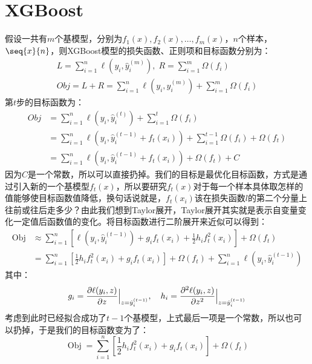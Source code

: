 \section{XGBoost}
假设一共有$m$个基模型，分别为$f_1(x),f_2(x),\dots,f_m(x)$，$n$个样本，$\seq{x}{n}$，则XGBoost模型的损失函数、正则项和目标函数分别为：
\begin{gather*}
	L=\sum_{i=1}^{n}\ell(y_i,\hat{y}_i^{(m)}),\;R=\sum_{i=1}^{m}\Omega(f_i) \\
	Obj=L+R=\sum_{i=1}^{n}\ell(y_i,\hat{y}_i^{(m)})+\sum_{i=1}^{m}\Omega(f_i)
\end{gather*}
第$t$步的目标函数为：
\begin{align*}
	Obj
	&=\sum_{i=1}^{n}\ell(y_i,\hat{y}_i^{(t)})+\sum_{i=1}^{t}\Omega(f_i) \\
	&=\sum_{i=1}^{n}\ell(y_i,\hat{y}_i^{(t-1)}+f_t(x_i))+\sum_{i=1}^{t-1}\Omega(f_i)+\Omega(f_t) \\
	&=\sum_{i=1}^{n}\ell(y_i,\hat{y}_i^{(t-1)}+f_t(x_i))+\Omega(f_t)+C
\end{align*}
因为$C$是一个常数，所以可以直接扔掉。我们的目标是最优化目标函数，方式是通过引入新的一个基模型$f_t(x)$，所以要研究$f_t(x)$对于每一个样本具体取怎样的值能够使目标函数值降低，换句话说就是，$f_t(x_i)$该在损失函数$l$的第二个分量上往前或往后走多少？由此我们想到Taylor展开，Taylor展开其实就是表示自变量变化一定值后函数值的变化。将目标函数进行二阶展开来近似可以得到：
\begin{align*}
	\operatorname{Obj}
	&\approx\sum_{i=1}^{n}\left[\ell(y_i,\hat{y}_i^{(t-1)})+g_if_t(x_i)+\frac{1}{2}h_if_t^2(x_i)\right]+\Omega(f_t) \\
	&=\sum_{i=1}^{n}\left[\frac{1}{2}h_if_t^2(x_i)+g_if_t(x_i)\right]+\Omega(f_t)+\sum_{i=1}^{n}\ell(y_i,\hat{y}_i^{(t-1)})
\end{align*}
其中：
\begin{equation*}
	g_i=\frac{\partial \ell(y_i,z)}{\partial z}\Big|_{z=\hat{y}_i^{(t-1)}},\quad
	h_i=\frac{\partial^2 \ell(y_i,z)}{\partial z^2}\Bigl|_{z=\hat{y}_i^{(t-1)}}
\end{equation*}
考虑到此时已经拟合成功了$t-1$个基模型，上式最后一项是一个常数，所以也可以扔掉，于是我们的目标函数变为了：
\begin{equation*}
	\operatorname{Obj}=\sum_{i=1}^{n}\left[\frac{1}{2}h_if_t^2(x_i)+g_if_t(x_i)\right]+\Omega(f_t)
\end{equation*}

